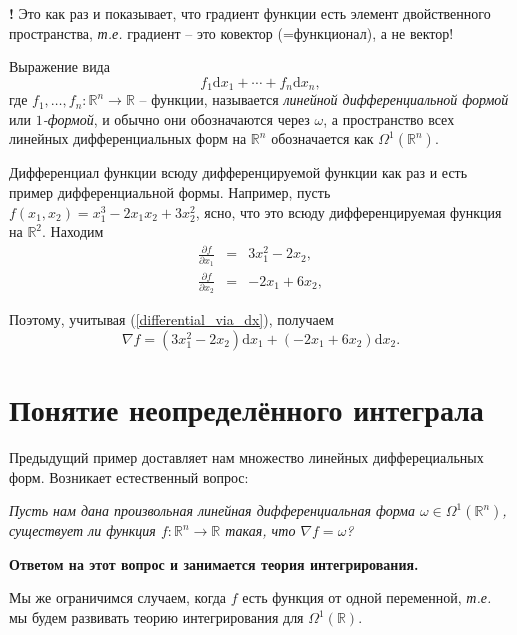\begin{mydanger}{\bf{!}}
    Это как раз и показывает, что градиент функции есть элемент двойственного пространства, \textit{т.е.} градиент -- это ковектор (=функционал), а не вектор!
\end{mydanger}

\begin{definition}
    Выражение вида 
    \[
     f_1 \mathrm{d}x_1 + \cdots + f_n \mathrm{d}x_n,
    \]
    где $f_1,\ldots, f_n:\mathbb{R}^n \to \mathbb{R}$ -- функции, называется \textit{линейной дифференциальной формой} или \textit{$1$-формой}, и обычно они обозначаются через $\omega$, а пространство всех линейных дифференциальных форм на $\mathbb{R}^n$ обозначается как $\Omega^1(\mathbb{R}^n).$
\end{definition}

\begin{example}
    Дифференциал функции всюду дифференцируемой функции как раз и есть пример дифференциальной формы. Например, пусть $f(x_1,x_2) = x_1^3 - 2x_1x_2 + 3x_2^2$, ясно, что это всюду дифференцируемая функция на $\mathbb{R}^2$. Находим
 \begin{eqnarray*}
   \frac{\partial f}{\partial x_1} &=& 3x_1^2 - 2x_2, \\
   \frac{\partial f}{\partial x_2} &=&  - 2x_1 + 6x_2,
 \end{eqnarray*}

Поэтому, учитывая (\ref{differential_via_dx}), получаем
\[
 \nabla f = (3x_1^2-2x_2)\mathrm{d}x_1 + (-2x_1 + 6x_2) \mathrm{d}x_2.
\]
    
\end{example}




\section{Понятие неопределённого интеграла}

Предыдущий пример доставляет нам множество линейных дифферециальных форм. Возникает естественный вопрос:~

\textit{Пусть нам дана произвольная линейная дифференциальная форма $\omega \in \Omega^1(\mathbb{R}^n)$, существует ли функция $f:\mathbb{R}^n \to \mathbb{R}$ такая, что $\nabla f = \omega$?}

\textbf{Ответом на этот вопрос и занимается теория интегрирования.}

Мы же ограничимся случаем, когда $f$ есть функция от одной переменной, \textit{т.е.} мы будем развивать теорию интегрирования для $\Omega^1(\mathbb{R}).$


